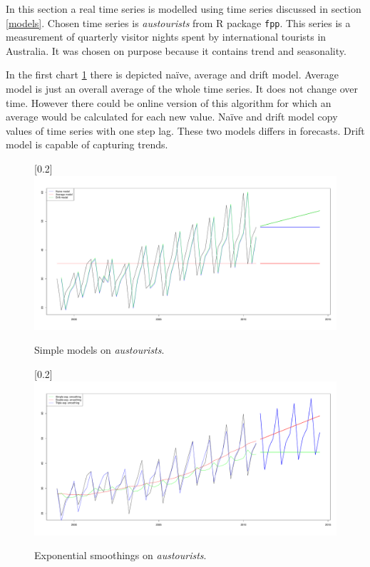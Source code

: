     In this section a real time series is modelled using time series discussed in section \ref{models}.
    Chosen time series is \emph{austourists} from R package \texttt{fpp}. This series is a measurement of quarterly
    visitor nights spent by international tourists in Australia. It was chosen on purpose because it
    contains trend and seasonality.

    In the first chart \ref{img:simple-models} there is depicted na\"{i}ve, average and drift model. Average model is
    just an overall average of the whole time series. It does not change over time. However there could be online
    version of this algorithm for which an average would be calculated for each new value. Na\"{i}ve and drift model
    copy values of time series with one step lag. These two models differs in forecasts. Drift model is capable of
    capturing trends.

    \begin{figure}[H]
        \begin{center}
            \scalebox{0.25}[0.2]{\includegraphics{img/simple-models.pdf}}
            \caption{Simple models on \emph{austourists}.}
            \label{img:simple-models}
        \end{center}
    \end{figure}

    \begin{figure}[H]
        \begin{center}
            \scalebox{0.25}[0.2]{\includegraphics{img/exp-smoothings.pdf}}
            \caption{Exponential smoothings on \emph{austourists}.}
            \label{img:exp-smoothings}
        \end{center}
    \end{figure}

